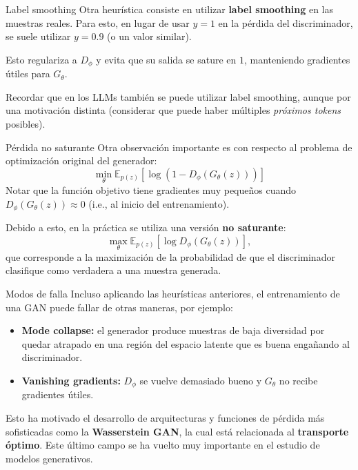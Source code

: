 \documentclass{beamer}
\begin{document}
\begin{frame}{Label smoothing}
    Otra heurística consiste en utilizar \textbf{label smoothing} en las muestras reales. Para esto, en lugar de usar $y=1$ en la pérdida del discriminador, se suele utilizar $y=0.9$ (o un valor similar).

    Esto regulariza a $D_\phi$ y evita que su salida se sature en $1$, manteniendo gradientes útiles para $G_\theta$.

    Recordar que en los LLMs también se puede utilizar label smoothing, aunque por una motivación distinta (considerar que puede haber múltiples \textit{próximos tokens} posibles).
\end{frame}

\begin{frame}{Pérdida no saturante}
    Otra observación importante es con respecto al problema de optimización original del generador:
    \begin{equation*}
        \min_\theta \mathbb{E}_{p(z)}\left[\log(1-D_\phi(G_\theta(z)))\right]
    \end{equation*}
    Notar que la función objetivo tiene gradientes muy pequeños cuando $D_\phi(G_\theta(z))\approx 0$ (i.e., al inicio del entrenamiento).

    Debido a esto, en la práctica se utiliza una versión \textbf{no saturante}:
    \begin{equation*}
        \max_\theta \mathbb{E}_{p(z)}\left[\log D_\phi(G_\theta(z))\right],
    \end{equation*}
    que corresponde a la maximización de la probabilidad de que el discriminador clasifique como verdadera a una muestra generada.
\end{frame}

\begin{frame}{Modos de falla}
    Incluso aplicando las heurísticas anteriores, el entrenamiento de una GAN puede fallar de otras maneras, por ejemplo:
    \begin{itemize}
        \item \textbf{Mode collapse:} el generador produce muestras de baja diversidad por quedar atrapado en una región del espacio latente que es buena engañando al discriminador.
        \item \textbf{Vanishing gradients:} $D_\phi$ se vuelve demasiado bueno y $G_\theta$ no recibe gradientes útiles.
    \end{itemize}
    Esto ha motivado el desarrollo de arquitecturas y funciones de pérdida más sofisticadas como la \textbf{Wasserstein GAN}, la cual está relacionada al \textbf{transporte óptimo}. Este último campo se ha vuelto muy importante en el estudio de modelos generativos.
\end{frame}
\end{document}
